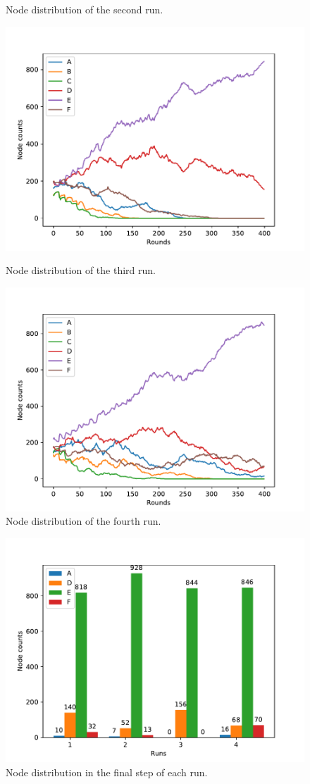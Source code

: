 \documentclass[11pt]{article}
\begin{document}
\begin{figure}[ht]
\begin{minipage}[b]{0.5\linewidth}
    \caption{Node distribution of the second run.}
  \end{minipage} 
  \begin{minipage}[b]{0.5\linewidth}
    \centering
    \includegraphics[width=0.9\linewidth]{results/04/run-3/distribution} 
	\caption{Node distribution of the third run.}
  \end{minipage}%
  \begin{minipage}[b]{0.5\linewidth}
    \centering
    \includegraphics[width=0.9\linewidth]{results/04/run-4/distribution} 
	\caption{Node distribution of the fourth run.}
  \end{minipage}
\end{figure}

\begin{figure}[h]
	\centering
	\includegraphics[width=0.5\linewidth]{results/04/distribution} 
	\caption{Node distribution in the final step of each run.}
\end{figure}
\end{document}
